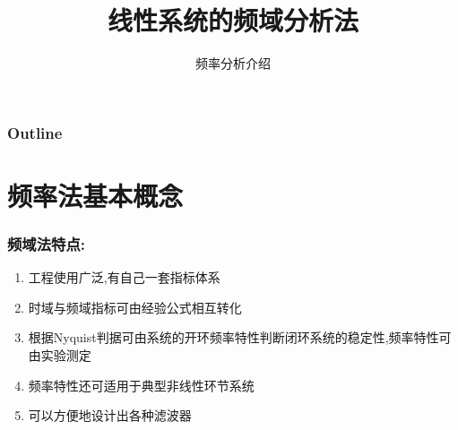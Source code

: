 \documentclass[table]{beamer}
\subtitle{频率分析介绍}
\title{线性系统的频域分析法}
\author{}
\date{}
\begin{document}
\maketitle

\begin{frame}
\frametitle{Outline}
\setcounter{tocdepth}{3}
\tableofcontents
\end{frame}













\section{频率法基本概念}
\label{sec-1}
\begin{frame}
\frametitle{频域法特点:}
\label{sec-1-1}

\begin{enumerate}
\item <2->工程使用广泛,有自己一套指标体系
\item <3->时域与频域指标可由经验公式相互转化
\item <4->根据Nyquist判据可由系统的开环频率特性判断闭环系统的稳定性,频率特性可由实验测定
\item <5->频率特性还可适用于典型非线性环节系统
\item <6->可以方便地设计出各种滤波器
\end{enumerate}
\end{frame}
\end{document}
